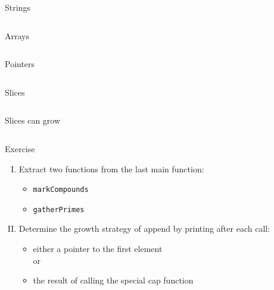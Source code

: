 \documentclass[10pt]{beamer}
\begin{document}
	
	\begin{frame}[t,fragile]{Strings}
		\inputminted{go}{code/02_strings.go}
	\end{frame}

	
	\begin{frame}[t,fragile]{Arrays}
		\inputminted{go}{code/03_arrays.go}
	\end{frame}

	
	\begin{frame}[t,fragile]{Pointers}
		\inputminted{go}{code/04_pointers.go}
	\end{frame}
	
	
	\begin{frame}[t,fragile]{Slices}
		\inputminted{go}{code/05_slices.go}
	\end{frame}
	
	
	\begin{frame}[t,fragile]{Slices can grow}
		\inputminted{go}{code/06_sieve.go}
	\end{frame}
	
	
	\begin{frame}[fragile]{Exercise}
		\begin{enumerate}[I.]
			\item Extract two functions from the last main function:
				\begin{itemize}
					\item \texttt{markCompounds}
					\item \texttt{gatherPrimes}
				\end{itemize}
			\item Determine the growth strategy of append by printing after each call:
				\begin{itemize}
					\item either a pointer to the first element\\
					or\\
					\item the result of calling the special cap function
				\end{itemize}
		\end{enumerate}
	\end{frame}
		
\end{document}
